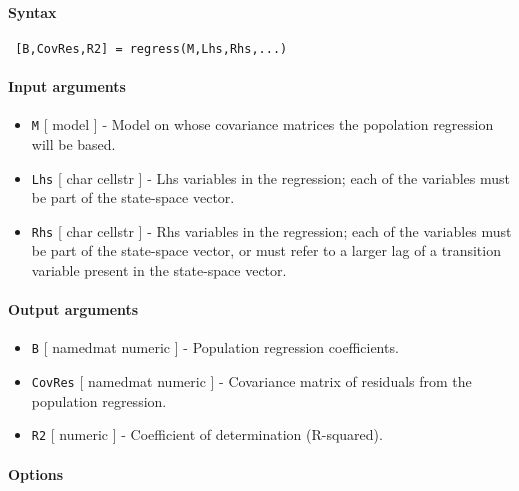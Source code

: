 


	\paragraph{Syntax}
 
 \begin{verbatim}
 [B,CovRes,R2] = regress(M,Lhs,Rhs,...)
 \end{verbatim}
 
 \paragraph{Input arguments}
 
 \begin{itemize}
 \item
   \texttt{M} {[} model {]} - Model on whose covariance matrices the
   popolation regression will be based.
 \item
   \texttt{Lhs} {[} char \textbar{} cellstr {]} - Lhs variables in the
   regression; each of the variables must be part of the state-space
   vector.
 \item
   \texttt{Rhs} {[} char \textbar{} cellstr {]} - Rhs variables in the
   regression; each of the variables must be part of the state-space
   vector, or must refer to a larger lag of a transition variable present
   in the state-space vector.
 \end{itemize}
 
 \paragraph{Output arguments}
 
 \begin{itemize}
 \item
   \texttt{B} {[} namedmat \textbar{} numeric {]} - Population regression
   coefficients.
 \item
   \texttt{CovRes} {[} namedmat \textbar{} numeric {]} - Covariance
   matrix of residuals from the population regression.
 \item
   \texttt{R2} {[} numeric {]} - Coefficient of determination
   (R-squared).
 \end{itemize}
 
 \paragraph{Options}
 
